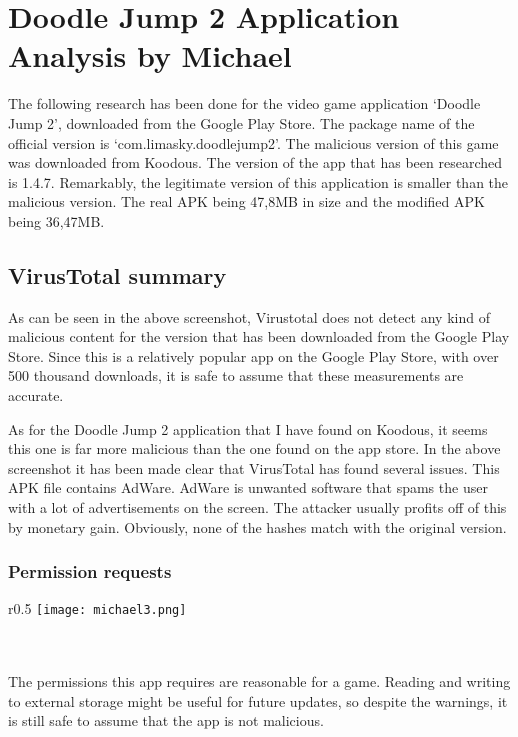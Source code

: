 \section{Doodle Jump 2 Application Analysis by Michael}

The following research has been done for the video game application ‘Doodle Jump 2’, downloaded from the Google Play Store. The package name of the official version is ‘com.limasky.doodlejump2’. The malicious version of this game was downloaded from Koodous. The version of the app that has been researched is 1.4.7. Remarkably, the legitimate version of this application is smaller than the malicious version. The real APK being 47,8MB in size and the modified APK being 36,47MB.
\subsection{VirusTotal summary}


\noindent{}

As can be seen in the above screenshot, Virustotal does not detect any kind of malicious content for the version that has been downloaded from the Google Play Store. Since this is a relatively popular app on the Google Play Store, with over 500 thousand downloads, it is safe to assume that these measurements are accurate.

\noindent{}

As for the Doodle Jump 2 application that I have found on Koodous, it seems this one is far more malicious than the one found on the app store. In the above screenshot it has been made clear that VirusTotal has found several issues. This APK file contains AdWare. AdWare is unwanted software that spams the user with a lot of advertisements on the screen. The attacker usually profits off of this by monetary gain. Obviously, none of the hashes match with the original version.
\subsubsection{Permission requests}

\begin{minipage}{\linewidth}
\begin{wrapfigure}{r}{0.5\textwidth}
\centering
\texttt{[image: michael3.png]}
\end{wrapfigure}

~\\
~\\
The permissions this app requires are reasonable for a game. Reading and writing to external storage might be useful for future updates, so despite the warnings, it is still safe to assume that the app is not malicious.
\end{minipage}

